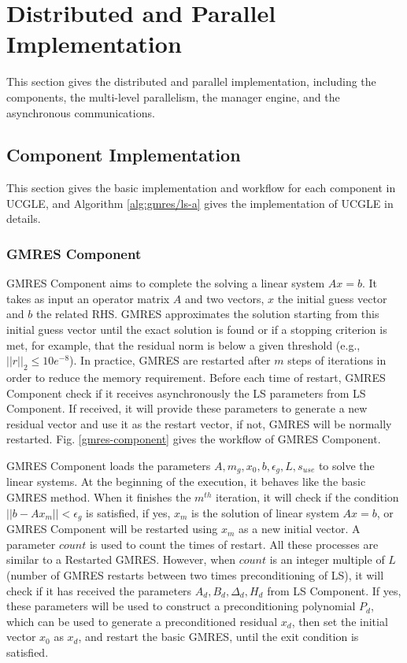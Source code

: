 \section{Distributed and Parallel Implementation}

This section gives the distributed and parallel implementation, including the components, the multi-level parallelism, the manager engine, and the asynchronous communications.
\subsection{Component Implementation}

This section gives the basic implementation and workflow for each component in UCGLE, and Algorithm \ref{alg:gmres/ls-a} gives the implementation of UCGLE in details.

\subsubsection{GMRES Component}

GMRES Component aims to complete the solving a linear system $Ax=b$. It takes as input an operator matrix $A$ and two vectors, $x$ the initial guess vector and $b$ the related RHS. GMRES approximates the solution starting from this initial guess vector until the exact solution is found or if a stopping criterion is met, for example, that the residual norm is below a given threshold (e.g., $||r||_2 \leq 10e^{-8}$). In practice, GMRES are restarted after $m$ steps of iterations in order to reduce the memory requirement. Before each time of restart, GMRES Component check if it receives asynchronously the LS parameters from LS Component. If received, it will provide these parameters to generate a new residual vector and use it as the restart vector, if not, GMRES will be normally restarted. Fig. \ref{gmres-component} gives the workflow of GMRES Component.

GMRES Component loads the parameters $A, m_g, x_0, b, \epsilon_g, L, s_{use}$ to solve the linear systems. At the beginning of the execution, it behaves like the basic GMRES method. When it finishes the $m^{th}$ iteration, it will check if the condition $||b-Ax_m||<\epsilon_g$ is satisfied, if yes, $x_m$ is the solution of linear system $Ax=b$, or GMRES Component will be restarted using $x_m$ as a new initial vector. A parameter $count$ is used to count the times of restart. All these processes are similar to a Restarted GMRES. However, when $count$ is an integer multiple of $L$ (number of GMRES restarts between two times preconditioning of LS), it will check if it has received the parameters $A_d, B_d, \Delta_d, H_d$ from LS Component. If yes, these parameters will be used to construct a preconditioning polynomial $P_d$, which can be used to generate a preconditioned residual $x_d$, then set the initial vector $x_0$ as $x_d$, and restart the basic GMRES, until the exit condition is satisfied.

